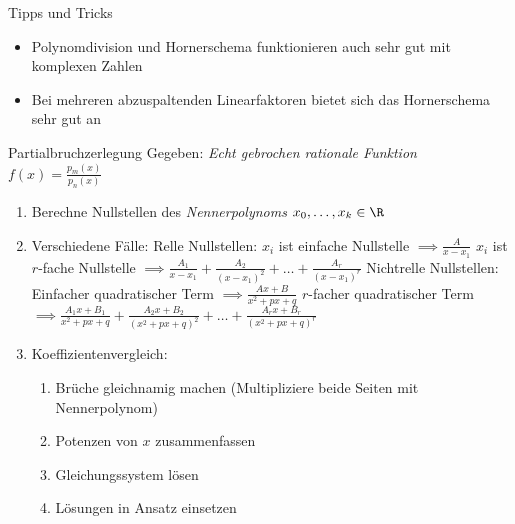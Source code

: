 \documentclass[german]{../spicker}
\begin{document}

\begin{bonus}{Tipps und Tricks}
    \begin{itemize}
        \item Polynomdivision und Hornerschema funktionieren auch sehr gut mit komplexen Zahlen
        \item Bei mehreren abzuspaltenden Linearfaktoren bietet sich das Hornerschema sehr gut an
    \end{itemize}
\end{bonus}

\begin{algo}{Partialbruchzerlegung}
    Gegeben: \emph{Echt gebrochen rationale Funktion}  $f(x) = \frac{p_m(x)}{p_n(x)}$
    \begin{enumerate}
        \item Berechne Nullstellen des \emph{Nennerpolynoms} $x_0, \ldots, x_k \in \R$
        \item Verschiedene Fälle:
              \subitem Relle Nullstellen:
              \subsubitem $x_i$ ist einfache Nullstelle $\implies \frac{A}{x-x_1}$
              \subsubitem $x_i$ ist $r$-fache Nullstelle $\implies  \frac{A_1}{x-x_1} +  \frac{A_2}{(x-x_1)^2} + \ldots + \frac{A_r}{(x-x_1)^r}$
              \subitem Nichtrelle Nullstellen:
              \subsubitem Einfacher quadratischer Term $\implies \frac{Ax + B}{x^2+px+q}$
              \subsubitem $r$-facher quadratischer Term $\implies \frac{A_1x + B_1}{x^2+px+q} + \frac{A_2x + B_2}{(x^2+px+q)^2} + \ldots + \frac{A_rx + B_r}{(x^2+px+q)^r}$
        \item Koeffizientenvergleich:
              \begin{enumerate}
                  \item Brüche gleichnamig machen (Multipliziere beide Seiten mit Nennerpolynom)
                  \item Potenzen von $x$ zusammenfassen
                  \item Gleichungssystem lösen
                  \item Lösungen in Ansatz einsetzen
              \end{enumerate}
    \end{enumerate}
\end{algo}
\end{document}
